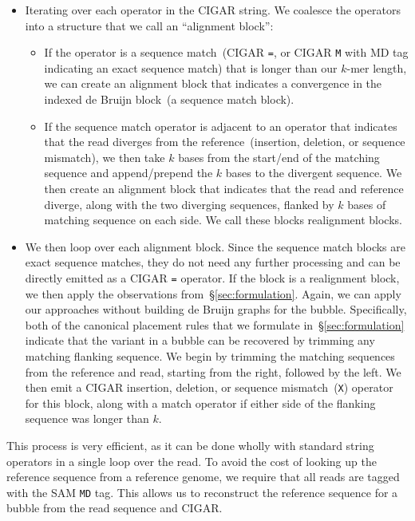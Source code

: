 \documentclass[phd]{ucbthesis}
\begin{document}
\begin{itemize}
\item Iterating over each operator in the CIGAR string. We coalesce the operators
into a structure that we call an ``alignment block'':
\begin{itemize}
\item If the operator is a sequence match~(CIGAR \texttt{=}, or CIGAR \texttt{M}
with MD tag indicating an exact sequence match) that is longer than our $k$-mer
length, we can create an alignment block that indicates a convergence in the
indexed de Bruijn block~(a sequence match block).
\item If the sequence match operator is adjacent to an operator that indicates
that the read diverges from the reference~(insertion, deletion, or sequence
mismatch), we then take $k$ bases from the start/end of the matching sequence
and append/prepend the $k$ bases to the divergent sequence. We then create an
alignment block that indicates that the read and reference diverge, along with
the two diverging sequences, flanked by $k$ bases of matching sequence on
each side. We call these blocks realignment blocks.
\end{itemize}
\item We then loop over each alignment block. Since the sequence match blocks
are exact sequence matches, they do not need any further processing and can be
directly emitted as a CIGAR \texttt{=} operator. If the block is a realignment
block, we then apply the observations from~\S\ref{sec:formulation}. Again, we
can apply our approaches without building de Bruijn graphs for the bubble.
Specifically, both of the canonical placement rules that we formulate
in~\S\ref{sec:formulation} indicate that the variant in a bubble can be recovered
by trimming any matching flanking sequence. We begin by trimming the matching
sequences from the reference and read, starting from the right, followed
by the left. We then emit a CIGAR insertion, deletion, or sequence
mismatch~(\texttt{X}) operator for this block, along with a match operator if
either side of the flanking sequence was longer than $k$.
\end{itemize}

This process is very efficient, as it can be done wholly with standard string
operators in a single loop over the read. To avoid the cost of looking up the
reference sequence from a reference genome, we require that all reads are
tagged with the SAM \texttt{MD} tag. This allows us to reconstruct the
reference sequence for a bubble from the read sequence and CIGAR.
\end{document}
